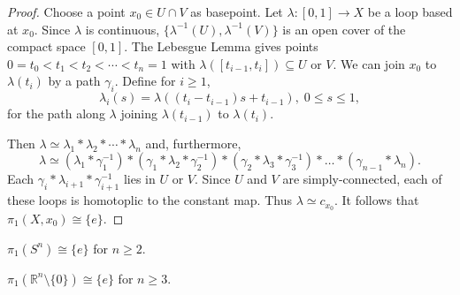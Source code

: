 \begin{proof}
Choose a point $x_0 \in U \cap V$ as basepoint. Let $\lambda : [0,1] \rightarrow X$ be a loop based at $x_0$. Since $\lambda$
is continuous, $\{ \lambda^{-1}(U), \lambda^{-1}(V) \}$ is an open cover of the compact space $[0,1]$. The Lebesgue Lemma gives points
$0 = t_0 < t_1 < t_2 < \cdots < t_n = 1$ with $\lambda([t_{i-1},t_i]) \subseteq U$ or $V$. We can join $x_0$ to $\lambda(t_i)$ by a path $\gamma_i$.
Define for $i \geq 1$,
$$\lambda_i(s) = \lambda((t_i - t_{i-1})s + t_{i-1}), \; 0 \leq s \leq 1,$$
for the path along $\lambda$ joining $\lambda(t_{i-1})$ to $\lambda(t_i)$.

Then $\lambda \simeq \lambda_1 * \lambda_2 * \cdots * \lambda_n$ and, furthermore,
$$\lambda \simeq (\lambda_1 * \gamma_1^{-1}) * (\gamma_1 * \lambda_2 * \gamma_2^{-1}) * (\gamma_2 * \lambda_3 * \gamma_3^{-1}) * \dots * (\gamma_{n-1} * \lambda_n).$$
Each $\gamma_i * \lambda_{i+1} * \gamma_{i+1}^{-1}$ lies in $U$ or $V$. Since $U$ and $V$ are simply-connected, each of these loops is homotoplic to the constant map.
Thus $\lambda \simeq c_{x_0}$. It follows that $\pi_1(X,x_0) \cong \{ e \}$.
\end{proof}

\begin{corollary}
$\pi_1(S^n) \cong \{ e \}$ for $n \geq 2$.
\end{corollary}

\begin{corollary}
$\pi_1(\mathbb{R}^n \setminus \{ 0 \}) \cong \{ e \}$ for $n \geq 3$.
\end{corollary}